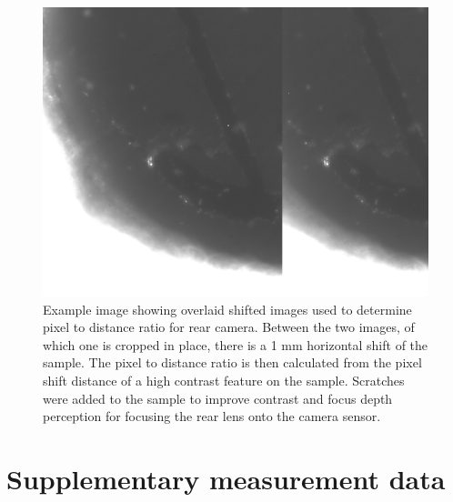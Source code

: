 \documentclass[twoside,openright,listof=numbered]{scrreprt}
\begin{document}
\begin{figure}[hbtp]
\centering
\includegraphics[width=0.5\linewidth]{images/TAM/BackFocus9.85mm-1mmHorizontalDiscplacement.png}
\caption[Example image showing overlaid shifted images used to determine pixel to distance ratio for rear camera.]{Example image showing overlaid shifted images used to determine pixel to distance ratio for rear camera. Between the two images, of which one is cropped in place, there is a 1 mm horizontal shift of the sample. The pixel to distance ratio is then calculated from the pixel shift distance of a high contrast feature on the sample. Scratches were added to the sample to improve contrast and focus depth perception for focusing the rear lens onto the camera sensor.\label{fig:micrometerToPxExample}}
\end{figure}

\section*{Supplementary measurement data}
\end{document}
